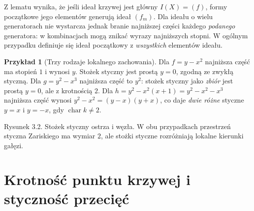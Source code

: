 \documentclass[11pt,a4paper,openany]{report}
\numberwithin{equation}{section}
\theoremstyle{plain}
\theoremstyle{definition}
\newtheorem{przyklad}[twierdzenie]{Przykład}
\theoremstyle{remark}
\begin{document}
Z lematu wynika, że jeśli ideał krzywej jest główny
$I(X)=(f)$, formy początkowe jego elementów generują
ideał $(f_m)$. Dla ideału o wielu generatorach nie wystarcza
jednak branie najniższej części każdego \emph{podanego}
generatora: w kombinacjach mogą znikać wyrazy najniższych
stopni. W ogólnym przypadku definiuje się ideał początkowy
z \emph{wszystkich} elementów ideału.

\begin{przyklad}[Trzy rodzaje lokalnego zachowania]
Dla $f=y-x^2$ najniższa część ma stopień $1$ i wynosi $y$.
Stożek styczny jest prostą $y=0$, zgodną ze zwykłą styczną.
Dla $g=y^2-x^3$ najniższa część to $y^2$:
stożek styczny jako \emph{zbiór} jest prostą $y=0$,
ale z krotnością $2$. Dla
$h=y^2-x^2(x+1)=y^2-x^2-x^3$ najniższa część
wynosi $y^2-x^2=(y-x)(y+x)$, co daje
\emph{dwie różne} styczne $y=x$ i $y=-x$,
gdy $\operatorname{char}k\ne2$.
\end{przyklad}

\begin{center}

\small Rysunek 3.2. Stożek styczny ostrza i węzła. W obu przypadkach
przestrzeń styczna Zariskiego ma wymiar $2$, ale stożki styczne
rozróżniają lokalne kierunki gałęzi.
\end{center}

\section{Krotność punktu krzywej i styczność przecięć}
\end{document}
